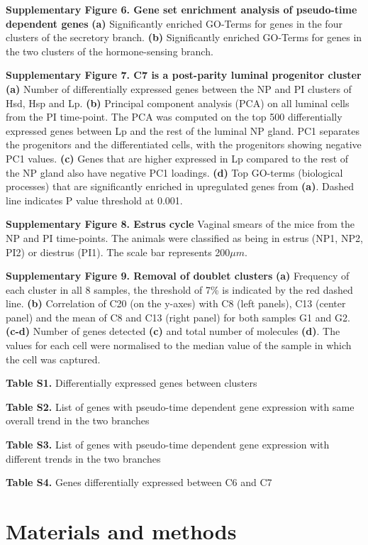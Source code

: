 \documentclass[titlepage, 12pt, oneside]{amsart}
\begin{document}
\textbf{Supplementary Figure 6. Gene set enrichment analysis of pseudo-time dependent genes}
\textbf{(a)} Significantly enriched GO-Terms for genes in the four clusters of the secretory branch.
\textbf{(b)} Significantly enriched GO-Terms for genes in the two clusters of the hormone-sensing branch.

\textbf{Supplementary Figure 7. C7 is a post-parity luminal progenitor cluster}
\textbf{(a)} Number of differentially expressed genes between the NP and PI clusters of Hsd, Hsp and Lp.
\textbf{(b)} Principal component analysis (PCA) on all luminal cells from the PI time-point.
The PCA was computed on the top 500 differentially expressed genes between Lp and the rest of the luminal NP gland.
PC1 separates the progenitors and the differentiated cells, with the progenitors showing negative PC1 values.
\textbf{(c)} Genes that are higher expressed in Lp compared to the rest of the NP gland also have negative PC1 loadings.
\textbf{(d)} Top GO-terms (biological processes) that are significantly enriched in upregulated genes from \textbf{(a)}.
Dashed line indicates P value threshold at 0.001.

\textbf{Supplementary Figure 8. Estrus cycle}
Vaginal smears of the mice from the NP and PI time-points. The animals were classified as being in estrus (NP1, NP2, PI2) or diestrus (PI1). The scale bar represents 200$\mu m$.

\textbf{Supplementary Figure 9. Removal of doublet clusters}
\textbf{(a)} Frequency of each cluster in all 8 samples, the threshold of 7\% is indicated by the red dashed line.
\textbf{(b)} Correlation of C20 (on the y-axes) with C8 (left panels), C13 (center panel) and the mean of C8 and C13 (right panel) for both samples G1 and G2.
\textbf{(c-d)} Number of genes detected \textbf{(c)} and total number of molecules \textbf{(d)}. The values for each cell were normalised to the median value of the sample in which the cell was captured.

\textbf{Table S1.} Differentially expressed genes between clusters

\textbf{Table S2.} List of genes with pseudo-time dependent gene
expression with same overall trend in the two branches

\textbf{Table S3.} List of genes with pseudo-time dependent gene
expression with different trends in the two branches

\textbf{Table S4.} Genes differentially expressed between C6 and C7 

\section{Materials and methods}
\end{document}
